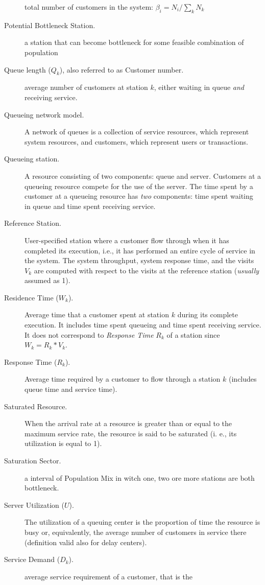 \begin{description}
total number of customers in the system: $\beta_i = N_i / \sum_k
N_k$ \item[Potential Bottleneck Station.] a station that can
become bottleneck for some feasible combination of population
\item[Queue length ($Q_k$), also referred to as Customer number.]
average number of customers at station $k$, either waiting in
queue \emph{and} receiving service. \item[Queueing network model.]
A network of queues is a collection of service resources, which
represent system resources, and customers, which represent users
or transactions. \item[Queueing station.] A resource consisting of
two components: queue and server. Customers at a queueing resource
compete for the use of the server. The time spent by a customer at
a queueing resource has \emph{two} components: time spent waiting
in queue and time spent receiving service. \item[Reference
Station.] User-specified station where a customer flow through
when it has completed its execution, i.e., it has performed an
entire cycle of service in the system. The system throughput,
system response time, and the visits $V_k$ are computed with
respect to the visits at the reference station (\emph{usually}
assumed as 1). \item[Residence Time ($W_k$).] Average time that a
customer spent at station $k$ during its complete execution. It
includes time spent queueing and time spent receiving service. It
does not correspond to \emph{Response Time} $R_k$ of a station
since $W_k = R_k * V_k$. \item[Response Time ($R_k$).] Average
time required by a customer to flow through a station $k$
(includes queue time and service time).
\item[Saturated Resource.]
When the arrival rate at a resource is greater than or equal to
the maximum service rate, the resource is said to be saturated (i.
e., its utilization is equal to 1). \item[Saturation Sector.] a
interval of Population Mix in witch one, two ore more stations are
both bottleneck. \item[Server Utilization ($U$).] The utilization
of a queuing center is the proportion of time the resource is busy
or, equivalently, the average number of customers in service there
(definition valid also for delay centers). \item[Service Demand
($D_k$).] average service requirement of a customer, that is the

\end{description}
